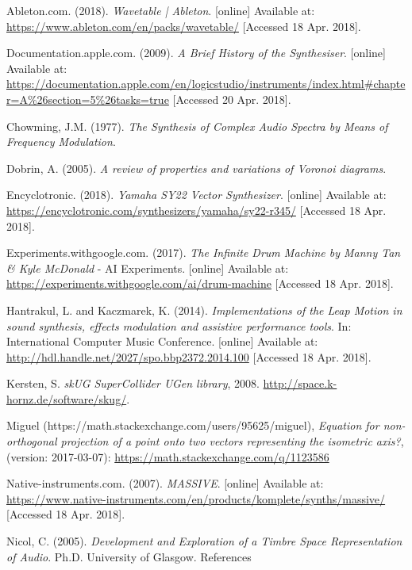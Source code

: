 \documentclass[11pt, oneside]{report}   	%
\begin{document}

\begin{thebibliography}{9}
\singlespacing

Ableton.com. (2018). \emph{Wavetable | Ableton}. [online] Available at: \url{https://www.ableton.com/en/packs/wavetable/} [Accessed 18 Apr. 2018].

Documentation.apple.com. (2009). \emph{A Brief History of the Synthesiser}. [online] Available at: \url{https://documentation.apple.com/en/logicstudio/instruments/index.html#chapter=A\%26section=5\%26tasks=true} [Accessed 20 Apr. 2018].

Chowming, J.M. (1977). \emph{The Synthesis of Complex Audio Spectra by Means of Frequency Modulation}.

Dobrin, A. (2005). \emph{A review of properties and variations of Voronoi diagrams}. 

Encyclotronic. (2018). \emph{Yamaha SY22 Vector Synthesizer}. [online] Available at: \url{https://encyclotronic.com/synthesizers/yamaha/sy22-r345/} [Accessed 18 Apr. 2018].

Experiments.withgoogle.com. (2017). \emph{The Infinite Drum Machine by Manny Tan \& Kyle McDonald} - AI Experiments. [online] Available at: \url{https://experiments.withgoogle.com/ai/drum-machine} [Accessed 18 Apr. 2018].

Hantrakul, L. and Kaczmarek, K. (2014). \emph{Implementations of the Leap Motion in sound synthesis, effects modulation and assistive performance tools}. In: International Computer Music Conference. [online] Available at:  \url{http://hdl.handle.net/2027/spo.bbp2372.2014.100} [Accessed 18 Apr. 2018].

Kersten, S. \emph{skUG SuperCollider UGen library}, 2008. \url{http://space.k- hornz.de/software/skug/}.

Miguel (https://math.stackexchange.com/users/95625/miguel), \emph{Equation for non-orthogonal projection of a point onto two vectors representing the isometric axis?}, (version: 2017-03-07): \url{https://math.stackexchange.com/q/1123586}

Native-instruments.com. (2007). \emph{MASSIVE}. [online] Available at: \url{https://www.native-instruments.com/en/products/komplete/synths/massive/} [Accessed 18 Apr. 2018].

Nicol, C. (2005). \emph{Development and Exploration of a Timbre Space Representation of Audio}. Ph.D. University of Glasgow.
References


\end{thebibliography}
\end{document}
